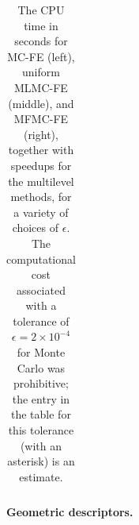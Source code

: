 \begin{table}[ht]
{\begin{tabular}{c|c|c|c|c|c|c|c|c|c|c|c|c|}
			\hline
	\end{tabular}
 }
	\caption{The CPU time in seconds for MC-FE (left), uniform MLMC-FE (middle), and MFMC-FE (right), together with speedups for the multilevel methods, for a variety of choices of $\epsilon$. The computational cost associated with a tolerance of $\epsilon = 2\times 10^{-4}$ for Monte Carlo was prohibitive; the entry in the table for this tolerance (with an asterisk) is an estimate.}
	\label{Tab:CPU_time}
\end{table}
%




\noindent \textbf{Geometric descriptors.}
%
\begin{table}[ht]
	\centering
	\caption{Geometric parameters of the expected poloidal flux $u$ from MC-FE with direct solver, MLMC-FE with direct solver,  MLMC-FE with direct solver with interpolating solution to a common fine grid of level $L=5$, MFMC-FE with surrogate with interpolating solution to a common fine grid of level $L=5$. The results are generated with an nMSE $4\times 10^{-4}$ on the geometry-conforming uniform mesh set.}
	\label{Tab: QoI_GeoInfo}
\end{table}






